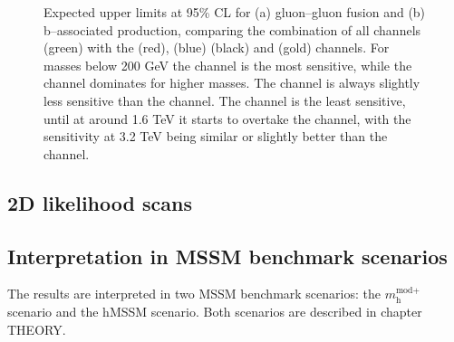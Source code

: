 \begin{figure}[h!]
\begin{center}
\end{center}
\caption{Expected upper limits at 95\% CL for (a) gluon--gluon fusion and (b) b--associated production,
comparing the combination of all channels (green) with the \mutau (red), \etau (blue) \tautau (black)
and \emu (gold) channels. For masses below 200 GeV the \mutau channel is the most sensitive,
while the \tautau channel dominates for higher masses. The \etau channel is always
slightly less sensitive than the \mutau channel. The \emu channel is the least sensitive, 
until at around 1.6 TeV it starts to overtake the \etau channel, with the sensitivity at 3.2 TeV 
being similar or slightly better than the \mutau channel.}
\label{fig:mssm_results_limits_breakdown}
\end{figure}

\subsection{2D likelihood scans}
\label{sec:mssm_results_2D}

\subsection{Interpretation in MSSM benchmark scenarios}
\label{sec:mssm_results_modeldep}
The results are interpreted in two MSSM benchmark scenarios: the $m_{\text{h}}^{\text{mod+}}$
scenario and the hMSSM scenario. Both scenarios are described in chapter THEORY.

